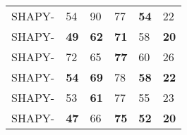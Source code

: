 \documentclass[10pt,twocolumn,letterpaper]{article}
\newcommand{\modelCOLOR}{black}
\newcommand{\modelname}{{\color{\modelCOLOR}SHAPY}\xspace}
\newcommand{\colorattr}{\color{PineGreen}}
\newcommand{\colorheight}{\color{Bittersweet}}
\newcommand{\colorcirc}{\color{OrangeRed}}
\newcommand{\heightVar}[0]{{\colorheight{H}}}
\newcommand{\attrVar}[0]{{\colorattr{A}}}
\newcommand{\circVar}[0]{{\colorcirc{C}}}
\begin{document}
\begin{appendices}
\begin{table}[t!]
\begin{tabular}{llllll}
        \modelname-\heightVar                 & 54          & 90          & 77          & \textbf{54} & 22          \\
        \modelname-\heightVar\attrVar         & \textbf{49} & \textbf{62} & \textbf{71} & 58          & \textbf{20} \\ \modelname-\circVar                   & 72          & 65          & \textbf{77} & 60          & 26          \\
        \modelname-\circVar\attrVar           & \textbf{54} & \textbf{69} & 78          & \textbf{58} & \textbf{22}
        \\ \modelname-\heightVar\circVar         & 53          & \textbf{61} & 77          & 55          & 23          \\
        \modelname-\heightVar\circVar\attrVar & \textbf{47} & 66          & \textbf{75} & \textbf{52} & \textbf{20} \\



\end{tabular}
\end{table}
\end{appendices}
\end{document}
